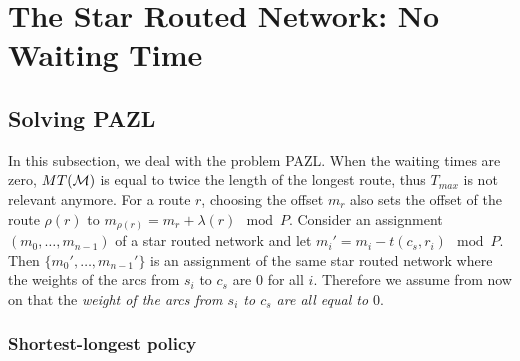 \documentclass[10pt, conference, letterpaper]{IEEEtran}
\begin{document}
%
%      
%      
%
%      
%      
%
    
\section{The Star Routed Network: No Waiting Time} \label{sec:PAZL}
  
   
  \subsection{Solving PAZL}
  
  In this subsection, we deal with the problem PAZL.  
  When the waiting times are zero, $MT({\cal M})$ is equal to twice the length of the longest route, thus $T_{max}$ is not relevant anymore. For a route $r$, choosing the offset $m_r$ also sets the offset of the route $\rho(r)$ to $m_{\rho(r)} = m_{r} + \lambda(r) \mod P$.
  Consider an assignment $(m_0,\dots,m_{n-1})$ of a star routed network and let $m_i'= m_{i} - t(c_s,r_i) \mod P$.
  Then $\{m_0',\dots,m_{n-1}'\}$ is an assignment of the same star routed network where the weights of the arcs from $s_i$ to $c_s$ are $0$ for all $i$. Therefore we assume from now on that the \emph{weight of the arcs from $s_i$ to $c_s$ are all equal to $0$}.
  
 
    \subsubsection*{Shortest-longest policy}
    
\end{document}
